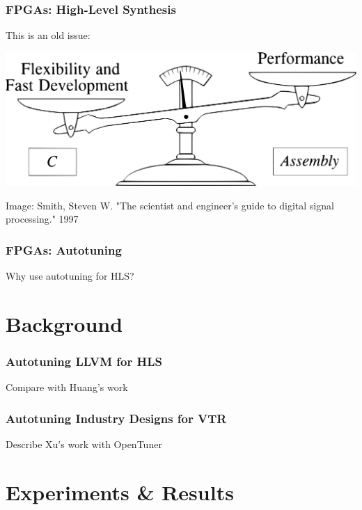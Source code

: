\documentclass[10pt, compress, xcolor={table,xcdraw,usenames}, aspectratio=169]{beamer}
\begin{document}
\begin{frame}
    \frametitle{FPGAs: High-Level Synthesis}
    \begin{block}{This is an \alert{old issue}:}
    \begin{center}
        \includegraphics[width=.74\textwidth]{tradeoff_software}

        \scriptsize{Image: Smith, Steven W. "The scientist and engineer's guide
        to digital signal processing." 1997}
    \end{center}
    \end{block}
\end{frame}

\begin{frame}
    \frametitle{FPGAs: Autotuning}
    \begin{block}{Why use autotuning for HLS?}
    \end{block}
\end{frame}

\section{Background}

\begin{frame}
    \frametitle{Autotuning LLVM for HLS}
    \begin{block}{Compare with Huang's work}
    \end{block}
\end{frame}

\begin{frame}
    \frametitle{Autotuning Industry Designs for VTR}
    \begin{block}{Describe Xu's work with OpenTuner}
    \end{block}
\end{frame}

\section{Experiments \& Results}
\end{document}
